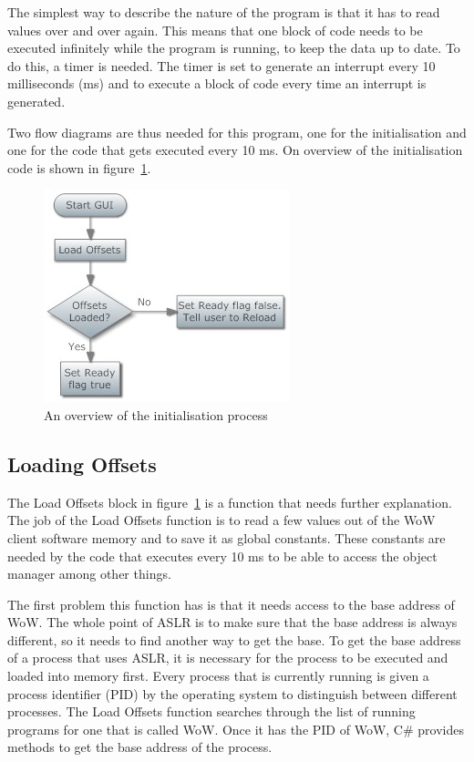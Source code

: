 The simplest way to describe the nature of the program is that it has to read values over and over again. This means that one block of code needs to be executed infinitely while the program is running, to keep the data up to date. To do this, a timer is needed. The timer is set to generate an interrupt every 10 milliseconds (ms) and to execute a block of code every time an interrupt is generated. 

Two flow diagrams are thus needed for this program, one for the initialisation and one for the code that gets executed every 10 ms. On overview of the initialisation code is shown in figure~\ref{init}.

\begin{figure}[htbp]  %
\centering
\includegraphics[scale = 0.65]{initover.jpg}	
\caption{An overview of the initialisation process}
\label{init}
\end{figure}

\subsection{Loading Offsets}

The Load Offsets block in figure~\ref{init} is a function that needs further explanation. The job of the Load Offsets function is to read a few values out of the WoW client software memory and to save it as global constants. These constants are needed by the code that executes every 10 ms to be able to access the object manager among other things.

The first problem this function has is that it needs access to the base address of WoW. The whole point of ASLR is to make sure that the base address is always different, so it needs to find another way to get the base. To get the base address of a process that uses ASLR, it is necessary for the process to be executed and loaded into memory first. Every process that is currently running is given a process identifier (PID) by the operating system to distinguish between different processes. The Load Offsets function searches through the list of running programs for one that is called WoW. Once it has the PID of WoW, C\# provides methods to get the base address of the process.

